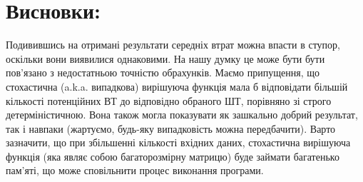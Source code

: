 \section{Висновки:}
Подивившись на отримані результати середніх втрат можна впасти в ступор, оскільки вони виявилися однаковими. На нашу думку це 
може бути бути пов'язано з недостатньою точністю обрахунків. Маємо припущення, що стохастична (a.k.a. випадкова) вирішуюча 
функція мала б відповідати більшій кількості потенційних ВТ до відповідно обраного ШТ, порівняно зі строго детерміністичною. 
Вона також могла показувати як зашкально добрий результат, так і навпаки (жартуємо, будь-яку випадковість можна передбачити). 
Варто зазначити, що при збільшенні кількості вхідних даних, стохастична вирішуюча функція (яка являє собою багаторозмірну 
матрицю) буде займати багатенько пам'яті, що може сповільнити процес виконання програми.

